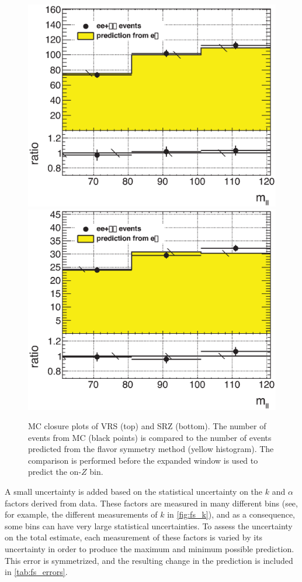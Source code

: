 \begin{centering}
\begin{figure}[!ht]
\myfloatalign
\includegraphics[width=.85\linewidth]{figures/fs/ee+mm_ratio_mll_VRZ_widened.eps}
\includegraphics[width=.85\linewidth]{figures/fs/ee+mm_ratio_mll_SRZ_widened.eps}
\caption{MC closure plots of VRS (top) and SRZ (bottom). The number of events from MC (black points) is compared to the number of events predicted from the flavor symmetry method (yellow histogram). The comparison is performed before the expanded \mll window is used to predict the on-$Z$ bin.}
\label{fig:fs_closure}
\end{figure}
\end{centering}

A small uncertainty is added based on the statistical uncertainty on the $k$ and $\alpha$ factors derived from data. These factors are measured in many different bins (see, for example, the different measurements of $k$ in \autoref{fig:fs_k}), and as a consequence, some bins can have very large statistical uncertainties. To assess the uncertainty on the total estimate, each measurement of these factors is varied by its uncertainty in order to produce the maximum and minimum possible prediction. This error is symmetrized, and the resulting change in the prediction is included in \autoref{tab:fs_errors}.

